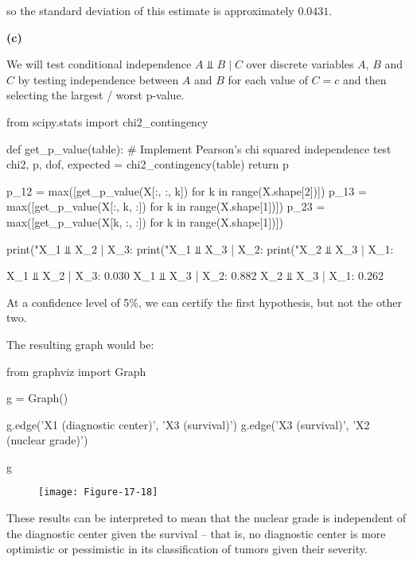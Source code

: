 so the standard deviation of this estimate is approximately \(0.0431\).

\textbf{(c)}

We will test conditional independence \(A \text{ ⫫ } B \;|\; C\) over
discrete variables \(A\), \(B\) and \(C\) by testing independence
between \(A\) and \(B\) for each value of \(C = c\) and then selecting
the largest / worst p-value.

\begin{python}
from scipy.stats import chi2_contingency

def get_p_value(table):
    # Implement Pearson's chi squared independence test
    chi2, p, dof, expected = chi2_contingency(table)
    return p
\end{python}

\begin{python}
p_{1}2 = max([get_p_value(X[:, :, k]) for k in range(X.shape[2])])
p_{1}3 = max([get_p_value(X[:, k, :]) for k in range(X.shape[1])])
p_{2}3 = max([get_p_value(X[k, :, :]) for k in range(X.shape[1])])

print("X_{1} ⫫ X_{2} | X_{3}:  %
print("X_{1} ⫫ X_{3} | X_{2}:  %
print("X_{2} ⫫ X_{3} | X_{1}:  %
\end{python}

\begin{console}
X\_{1} ⫫ X\_{2} | X\_{3}:  0.030
X\_{1} ⫫ X\_{3} | X\_{2}:  0.882
X\_{2} ⫫ X\_{3} | X\_{1}:  0.262
\end{console}

At a confidence level of 5\%, we can certify the first hypothesis, but
not the other two.

The resulting graph would be:

\begin{python}
from graphviz import Graph

g = Graph()

g.edge('X1 (diagnostic center)', 'X3 (survival)')
g.edge('X3 (survival)', 'X2 (nuclear grade)')

g
\end{python}

\begin{figure}[H]
\centering
\texttt{[image: Figure-17-18]}
\end{figure}

These results can be interpreted to mean that the nuclear grade is
independent of the diagnostic center given the survival -- that is, no
diagnostic center is more optimistic or pessimistic in its
classification of tumors given their severity.
